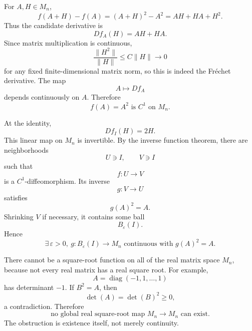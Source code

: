 \begin{solution}
For \(A,H\in M_n\),
\[
f(A+H)-f(A)
=
(A+H)^2-A^2
=
AH+HA+H^2.
\]
Thus the candidate derivative is
\[
Df_A(H)=AH+HA.
\]
Since matrix multiplication is continuous,
\[
\frac{\|H^2\|}{\|H\|}
\le
C\|H\|\to0
\]
for any fixed finite-dimensional matrix norm, so this is indeed the Fréchet derivative.
The map
\[
A\longmapsto Df_A
\]
depends continuously on \(A\). Therefore
\[
\boxed{f(A)=A^2\text{ is }C^1\text{ on }M_n.}
\]

At the identity,
\[
Df_I(H)=2H.
\]
This linear map on \(M_n\) is invertible. By the inverse function theorem, there are
neighborhoods
\[
U\ni I,\qquad V\ni I
\]
such that
\[
f:U\to V
\]
is a \(C^1\)-diffeomorphism. Its inverse
\[
g:V\to U
\]
satisfies
\[
g(A)^2=A.
\]
Shrinking \(V\) if necessary, it contains some ball
\[
B_\varepsilon(I).
\]
Hence
\[
\boxed{
\exists\,\varepsilon>0,\ 
g:B_\varepsilon(I)\to M_n
\text{ continuous with }g(A)^2=A.
}
\]

There cannot be a square-root function on all of the real matrix space \(M_n\), because not
every real matrix has a real square root. For example,
\[
A=\operatorname{diag}(-1,1,\ldots,1)
\]
has determinant \(-1\). If \(B^2=A\), then
\[
\det(A)
=
\det(B)^2
\ge0,
\]
a contradiction. Therefore
\[
\boxed{\text{no global real square-root map }M_n\to M_n\text{ can exist}.}
\]
The obstruction is existence itself, not merely continuity.
\end{solution}



